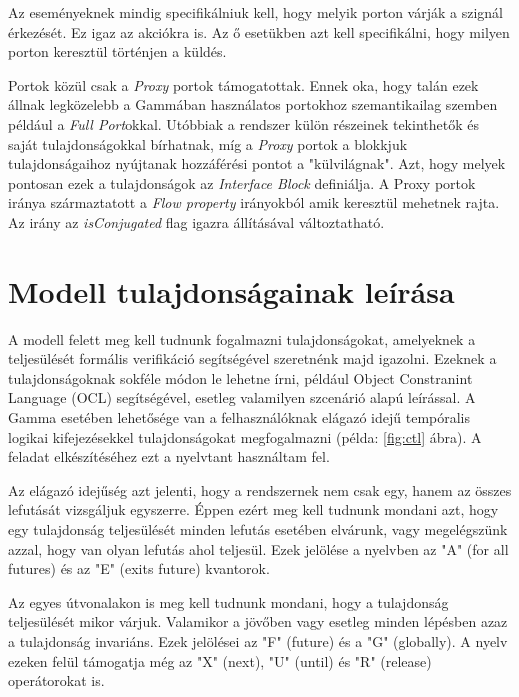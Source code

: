 Az eseményeknek mindig specifikálniuk kell, hogy melyik porton várják a szignál érkezését. Ez igaz az akciókra is. Az ő esetükben azt kell specifikálni, hogy milyen porton keresztül történjen a küldés.

Portok közül csak a \emph{Proxy} portok támogatottak. Ennek oka, hogy talán ezek állnak legközelebb a Gammában használatos portokhoz szemantikailag szemben például a \emph{Full Port}okkal. Utóbbiak a rendszer külön részeinek tekinthetők és saját tulajdonságokkal bírhatnak, míg a \emph{Proxy} portok a blokkjuk tulajdonságaihoz nyújtanak hozzáférési pontot a "külvilágnak". Azt, hogy melyek pontosan ezek a tulajdonságok az \emph{Interface Block} definiálja.
A Proxy portok iránya származtatott a \emph{Flow property} irányokból amik keresztül mehetnek rajta. Az irány az \emph{isConjugated} flag igazra állításával változtatható.

\section{Modell tulajdonságainak leírása}

A modell felett meg kell tudnunk fogalmazni tulajdonságokat, amelyeknek a teljesülését formális verifikáció segítségével szeretnénk majd igazolni. Ezeknek a tulajdonságoknak sokféle módon le lehetne írni, például Object Constranint Language (OCL) segítségével, esetleg valamilyen szcenárió alapú leírással. A Gamma esetében lehetősége van a felhasználóknak elágazó idejű tempóralis logikai kifejezésekkel tulajdonságokat megfogalmazni (példa: \ref{fig:ctl} ábra). A feladat elkészítéséhez ezt a nyelvtant használtam fel.

Az elágazó idejűség azt jelenti, hogy a rendszernek nem csak egy,  hanem az összes lefutását vizsgáljuk egyszerre. Éppen ezért meg kell tudnunk mondani azt, hogy egy tulajdonság teljesülését minden lefutás esetében elvárunk, vagy megelégszünk azzal, hogy van olyan lefutás ahol teljesül. Ezek jelölése a nyelvben az "A" (for all futures) és az "E" (exits future) kvantorok.

Az egyes útvonalakon is meg kell tudnunk mondani, hogy a tulajdonság teljesülését mikor várjuk. Valamikor a jövőben vagy esetleg minden lépésben azaz a tulajdonság invariáns. Ezek jelölései az "F" (future) és a "G" (globally). A nyelv ezeken felül támogatja még az "X" (next), "U" (until) és "R" (release) operátorokat is.

